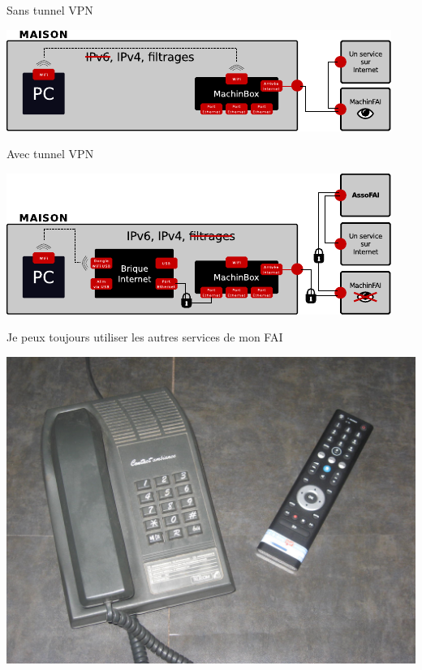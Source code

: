 \documentclass[notes=hide]{beamer}
\begin{document}
\begin{frame}[t]{Sans tunnel VPN}
\begin{center}
\vfill
\includegraphics[width=.9\textwidth]{img/schema3.pdf}
\vfill
\end{center}
\end{frame}

\begin{frame}[t]{Avec tunnel VPN}
\begin{center}
\vfill
\includegraphics[width=.9\textwidth]{img/schema4.pdf}
\vfill
\end{center}
\end{frame}



\begin{frame}[t]{Je peux toujours utiliser les autres services de mon FAI}
\begin{center}
\vfill
\includegraphics[width=.75\textwidth]{img/13-photo-teltv.jpg}
\vfill
\end{center}
\end{frame}
\end{document}
